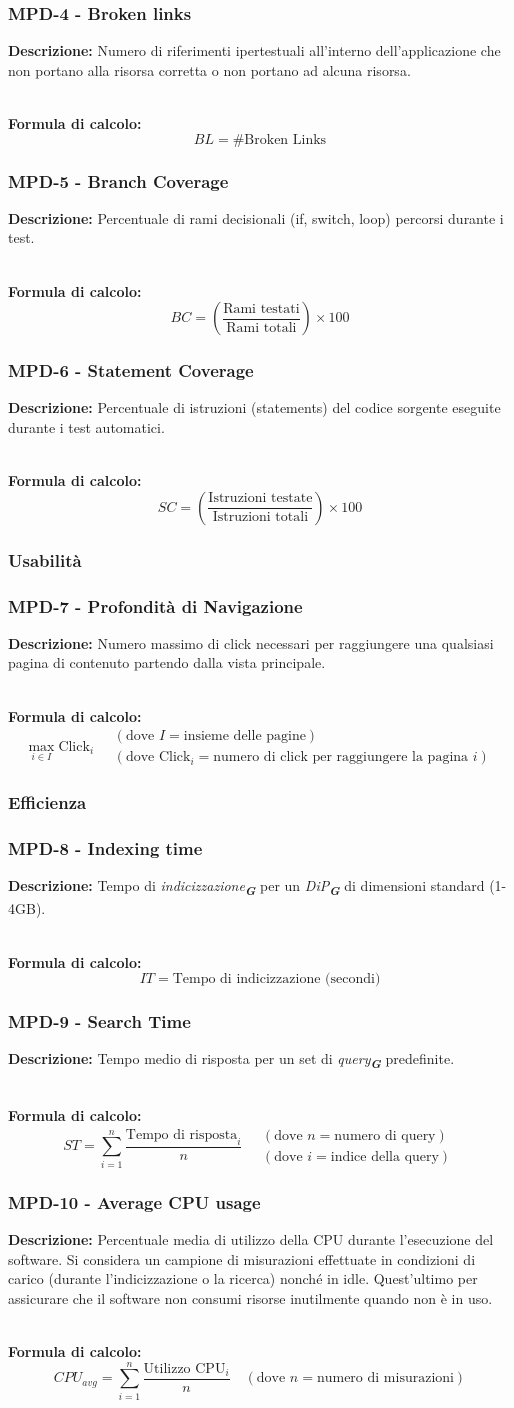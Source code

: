 \documentclass[a4paper,12pt]{article}
\newcommand{\glossario}[1]{\textit{#1}\textsubscript{\textbf{\textit{\textcolor{lightblack}{G}}}}}
\newcommand{\metricdef}[3]{
    \subsubsection*{#1 - #2}
    \textbf{Descrizione:} #3
}
\newcommand{\metricformula}[1]{
    \\[0.5em]
    \textbf{Formula di calcolo:}
    \begin{equation*}
        #1
    \end{equation*}
}
\begin{document}
\metricdef{MPD-4}{Broken links}
{Numero di riferimenti ipertestuali all'interno dell'applicazione che non portano alla risorsa corretta o non portano ad alcuna risorsa.}
\metricformula{BL = \#\text{Broken Links}}

\metricdef{MPD-5}{Branch Coverage}
{Percentuale di rami decisionali (if, switch, loop) percorsi durante i test.}
\metricformula{BC = \left( \frac{\text{Rami testati}}{\text{Rami totali}} \right) \times 100}

\metricdef{MPD-6}{Statement Coverage}
{Percentuale di istruzioni (statements) del codice sorgente eseguite durante i test automatici.}
\metricformula{SC = \left( \frac{\text{Istruzioni testate}}{\text{Istruzioni totali}} \right) \times 100}

\subsubsection{Usabilità}

\metricdef{MPD-7}{Profondità di Navigazione}
{Numero massimo di click necessari per raggiungere una qualsiasi pagina di contenuto partendo dalla vista principale.}
\metricformula{\max_{i \in I} \text{Click}_i \quad \begin{array}{l} (\text{dove } I = \text{insieme delle pagine}) \\ (\text{dove } \text{Click}_i = \text{numero di click per raggiungere la pagina } i) \end{array}}

\subsubsection{Efficienza}

\metricdef{MPD-8}{Indexing time}
{Tempo di \glossario{indicizzazione} per un \glossario{DiP} di dimensioni standard (1-4GB).}
\metricformula{IT = \text{Tempo di indicizzazione (secondi)}}

\metricdef{MPD-9}{Search Time}
{Tempo medio di risposta per un set di \glossario{query} predefinite.}
\metricformula{ST = \sum_{i=1}^{n} \frac{\text{Tempo di risposta}_i}{n} \quad \begin{array}{l} (\text{dove } n = \text{numero di query}) \\ (\text{dove }i = \text{indice della query}) \end{array}}

\metricdef{MPD-10}{Average CPU usage}
{Percentuale media di utilizzo della CPU durante l'esecuzione del software. Si considera un campione di misurazioni effettuate in condizioni di carico (durante l'indicizzazione o la ricerca) nonché in idle. Quest'ultimo per assicurare che il software non consumi risorse inutilmente quando non è in uso.}
\metricformula{CPU_{avg} = \sum_{i=1}^{n} \frac{\text{Utilizzo CPU}_i}{n} \quad (\text{dove }n = \text{numero di misurazioni})}
\end{document}
